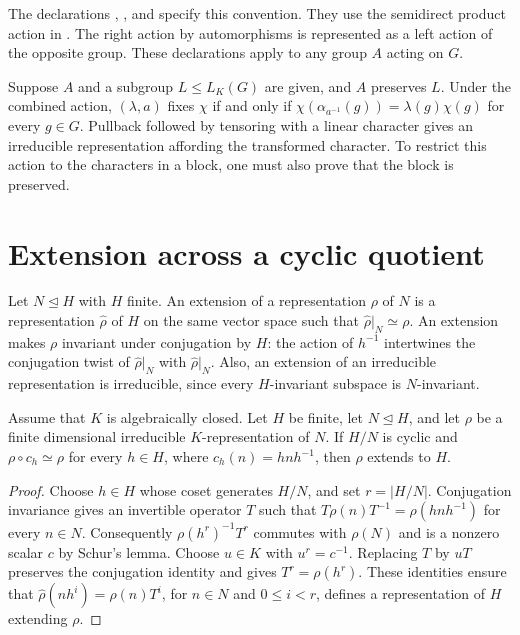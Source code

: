 \begin{implementation}
The declarations
,
,
 and
 specify this convention.
They use the semidirect product action in
. The right action by
automorphisms is represented as a left action of the opposite group.
These declarations apply to any group $A$ acting on $G$.
\end{implementation}

\begin{example}
Suppose $A$ and a subgroup $L\leq L_K(G)$ are given, and $A$ preserves $L$.
Under the combined action, $(\lambda,a)$ fixes $\chi$ if and only if
$\chi(\alpha_{a^{-1}}(g))=\lambda(g)\chi(g)$ for every $g\in G$.
Pullback followed by tensoring with a linear character gives an irreducible
representation affording the transformed character. To restrict this
action to the characters in a block, one must also prove that the block
is preserved.
\end{example}

\section{Extension across a cyclic quotient}
\label{lib:ordinary:cyclic-extension}

Let $N\trianglelefteq H$ with $H$ finite. An extension of a representation
$\rho$ of $N$ is a representation $\widehat\rho$ of $H$ on the same vector
space such that
$\widehat\rho|_N\simeq\rho$. An extension makes $\rho$ invariant
under conjugation by $H$: the action of $h^{-1}$ intertwines the
conjugation twist of $\widehat\rho|_N$ with $\widehat\rho|_N$.
Also, an extension of an irreducible representation is irreducible, since
every $H$-invariant subspace is $N$-invariant.

\begin{theorem}
\label{lib:ordinary:cyclic-principle}
Assume that $K$ is algebraically closed. Let $H$ be finite, let
$N\trianglelefteq H$, and let $\rho$ be a finite
dimensional irreducible $K$-representation of $N$. If $H/N$ is cyclic
and $\rho\circ c_h\simeq\rho$ for every $h\in H$, where
$c_h(n)=hnh^{-1}$, then $\rho$ extends to $H$.
\end{theorem}
\begin{proof}
Choose $h\in H$ whose coset generates $H/N$, and set $r=|H/N|$.
Conjugation invariance gives an invertible operator $T$ such that
$T\rho(n)T^{-1}=\rho(hnh^{-1})$ for every $n\in N$.
Consequently $\rho(h^r)^{-1}T^r$ commutes with $\rho(N)$ and is
a nonzero scalar $c$ by Schur's lemma. Choose $u\in K$ with
$u^r=c^{-1}$. Replacing $T$ by $uT$ preserves the conjugation
identity and gives $T^r=\rho(h^r)$.
These identities ensure that $\widehat\rho(nh^i)=\rho(n)T^i$,
for $n\in N$ and $0\leq i<r$, defines a representation of $H$
extending $\rho$.
\end{proof}

